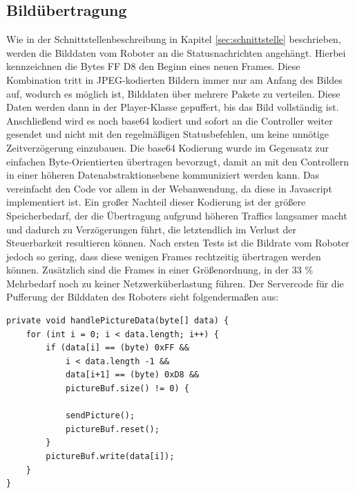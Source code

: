 \subsection{Bildübertragung}
Wie in der Schnittstellenbeschreibung in Kapitel \ref{sec:schnittstelle} beschrieben, werden die Bilddaten vom Roboter an die Statusnachrichten angehängt. Hierbei kennzeichnen die Bytes FF D8 den Beginn eines neuen Frames. Diese Kombination tritt in JPEG-kodierten Bildern immer nur am Anfang des Bildes auf, wodurch es möglich ist, Bilddaten über mehrere Pakete zu verteilen. Diese Daten werden dann in der Player-Klasse gepuffert, bis das Bild vollständig ist. Anschließend wird es noch base64 kodiert und sofort an die Controller weiter gesendet und nicht mit den regelmäßigen Statusbefehlen, um keine unnötige Zeitverzögerung einzubauen. Die base64 Kodierung wurde im Gegensatz zur einfachen Byte-Orientierten übertragen bevorzugt, damit an mit den Controllern in einer höheren Datenabstraktionsebene kommuniziert werden kann. Das vereinfacht den Code vor allem in der Webanwendung, da diese in Javascript implementiert ist. Ein großer Nachteil dieser Kodierung ist der größere Speicherbedarf, der die Übertragung aufgrund höheren Traffics langsamer macht und dadurch zu Verzögerungen führt, die letztendlich im Verlust der Steuerbarkeit resultieren können. Nach ersten Tests ist die Bildrate vom Roboter jedoch so gering, dass diese wenigen Frames rechtzeitig übertragen werden können. Zusätzlich sind die Frames in einer Größenordnung, in der 33 \% Mehrbedarf noch zu keiner Netzwerküberlastung führen. Der Servercode für die Pufferung der Bilddaten des Roboters sieht folgendermaßen aus:

\begin{lstlisting}
private void handlePictureData(byte[] data) {
	for (int i = 0; i < data.length; i++) {
		if (data[i] == (byte) 0xFF && 
			i < data.length -1 && 
			data[i+1] == (byte) 0xD8 && 
			pictureBuf.size() != 0) {
			
			sendPicture();
			pictureBuf.reset();
		}
		pictureBuf.write(data[i]);
	}
}
\end{lstlisting}



